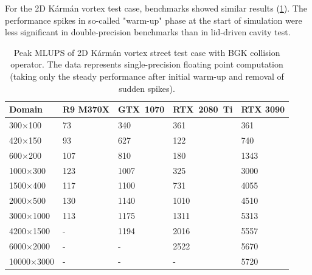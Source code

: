 For the 2D Kármán vortex test case, benchmarks showed similar results (\ref{tab:channel-mlups}). The performance spikes in so-called "warm-up" phase at the start of simulation were less significant in double-precision benchmarks than in lid-driven cavity test. 

\begin{table}[!ht]
	\centering\small
	{\renewcommand{\arraystretch}{1.1}%
		{\setlength{\tabcolsep}{0.5em}
	\begin{tabular}{ |p{2.7cm}||p{2.2cm}|p{2.2cm}|p{2.4cm}|p{2.21cm}|  }
		\hline
		Domain & R9 M370X & GTX~1070 & RTX~2080~Ti & RTX 3090 \\
		\hline
		300$\times$100   & 73 & 340 & 361    & 361  \\
		\hline
		420$\times$150   & 93 & 627 & 122    & 740  \\
		\hline
		600$\times$200   & 107 & 810 & 180    & 1343  \\
		\hline
		1000$\times$300   & 123 & 1007 & 325    & 3000  \\
		\hline
		1500$\times$400   & 117 & 1100 & 731    & 4055  \\
		\hline
		2000$\times$500   & 130 & 1140 & 1010    & 4510  \\
		\hline
		3000$\times$1000   & 113 & 1175 & 1311    & 5313  \\
		\hline
		4200$\times$1500   & - & 1194 & 2016    & 5557  \\
		\hline
		6000$\times$2000   & - & - & 2522  & 5670  \\
		\hline
		10000$\times$3000   & - & - & -   & 5720  \\
		\hline
	\end{tabular}}}
	\caption{Peak MLUPS of 2D Kármán vortex street test case with BGK collision operator. The data represents single-precision floating point computation (taking only the steady performance after initial warm-up and removal of sudden spikes).}
	\label{tab:channel-mlups}
\end{table}


